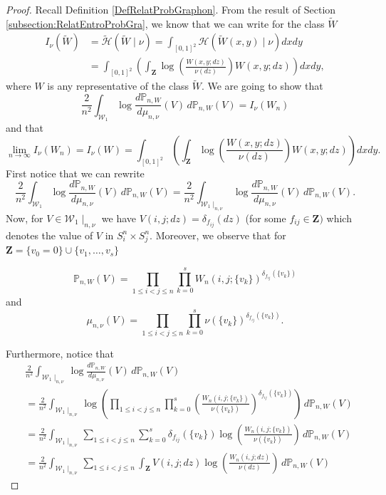 \documentclass[12pt,twoside,a4paper]{article}
\newcommand{\Square}{{S^n_i\times S^n_j}}
\newcommand{\Space}{\mathbf{Z}}
\newcommand{\lep}{\left(}
\newcommand{\rip}{\right)}
\begin{document}
\begin{proof}
Recall Definition \ref{DefRelatProbGraphon}. From the result of Section \ref{subsection:RelatEntroProbGra}, we know that we can write for the class $\widetilde{W}$ 
\[
\begin{split}
I_\nu(\widetilde{W})&=\widetilde{\mathcal{H}}(\widetilde{W}\mid \nu)=\int_{[0,1]^2} \mathcal{H}(\widetilde{W}(x,y)\mid \nu) dxdy\\
&=\int_{[0,1]^2} \lep \int_\Space\log\lep\frac{W(x,y;dz)}{ \nu(dz)}\rip W(x,y;dz) \rip dx dy,
\end{split}
\]
where $W$ is any representative of the class $\widetilde{W}$. We are going to show that 
\[
\frac{2}{n^2} \int_{\mathcal{W}_1} \log \frac{d\mathbb{P}_{n,W}}{d\mu_{n,\nu}}(V) \, d\mathbb{P}_{n,W}(V)=I_\nu(W_n)
\]
and that
\[\lim_{n\to\infty} I_\nu(W_n)=I_\nu(W)=\int_{[0,1]^2} \lep \int_\Space\log\lep\frac{W(x,y;dz)}{ \nu(dz)}\rip W(x,y;dz) \rip dx dy.
\]
First notice that we can rewrite 
\[
\frac{2}{n^2} \int_{\mathcal{W}_1} \log \frac{d\mathbb{P}_{n,W}}{d\mu_{n,\nu}}(V) \, d\mathbb{P}_{n,W}(V)=\frac{2}{n^2} \int_{\mathcal{W}_1\mid_{n,\nu}}\log \frac{d\mathbb{P}_{n,W}}{d\mu_{n,\nu}}(V) \, d\mathbb{P}_{n,W}(V).
\]
Now, for $V\in \mathcal{W}_1\mid_{n,\nu}$ we have $V(i,j;dz)=\delta_{f_{ij}}(dz)$ (for some $f_{ij}\in \Space)$ which denotes the value of $V$ in $\Square.$ Moreover, we observe that for $\Space=\{v_0=0\}\cup\{v_1,\ldots,v_{s}\}$ 

\[
\mathbb{P}_{n,W}(V)=\prod_{1 \leq i < j \leq n} \prod^s_{k=0}W_n(i,j;\{v_k\})^{\delta_{f_{ij}}(\{v_k\})}
\]
and
\[
\mu_{n,\nu}(V)=\prod_{1 \leq i < j \leq n} \prod^s_{k=0}\nu(\{v_k\})^{\delta_{f_{ij}}(\{v_k\})}.
\]

Furthermore, notice that 
\[
\begin{aligned}
&\frac{2}{n^2} \int_{\mathcal{W}_1\mid_{n,\nu}}\log \frac{d\mathbb{P}_{n,W}}{d\mu_{n,\nu}}(V) \, d\mathbb{P}_{n,W}(V)\\
&=\frac{2}{n^2} \int_{\mathcal{W}_1\mid_{n,\nu}} \log\left( \prod_{1\leq i<j\leq n}\prod^s_{k=0}\left(\frac{W_n(i,j;\{v_k\})}{\nu(\{v_k\})} \right)^{\delta_{f_{ij}}(\{v_k\})}\right)\, d\mathbb{P}_{n,W}(V)
\\
&=\frac{2}{n^2} \int_{\mathcal{W}_1\mid_{n,\nu}} \sum_{1\leq i<j\leq n}\sum^s_{k=0}{\delta_{f_{ij}}(\{v_k\})}\log\left( \frac{W_n(i,j;\{v_k\})}{\nu(\{v_k\})} \right)\, d\mathbb{P}_{n,W}(V)
\\
&=
\frac{2}{n^2}\int_{\mathcal{W}_1\mid_{n,\nu}}\sum_{1\leq i<j\leq n} \int_{\Space}V(i,j;dz)  \log \left(\frac{W_n(i,j;dz)}{\nu(dz)}\right) \, d\mathbb{P}_{n,W}(V)
\end{aligned}
\]


\end{proof}
\end{document}
